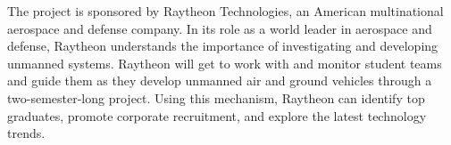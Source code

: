 The project is sponsored by Raytheon Technologies, an American multinational aerospace and defense company.  In its role as a world leader in aerospace and defense, Raytheon understands the importance of investigating and developing unmanned systems. Raytheon will get to work with and monitor student teams and guide them as they develop unmanned air and ground vehicles through a two-semester-long project. Using this mechanism, Raytheon can identify top graduates, promote corporate recruitment, and explore the latest technology trends.